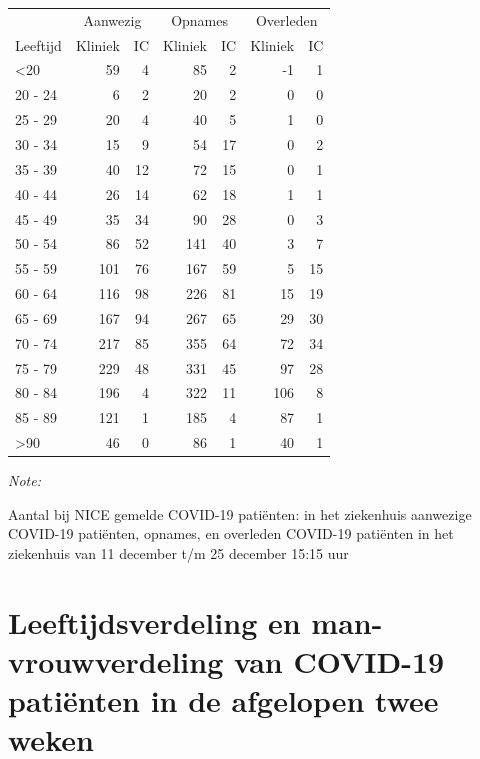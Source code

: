 \documentclass[
  english,
  man,floatsintext]{apa6}
\begin{document}
\begin{table}
\centering\begingroup\fontsize{10}{12}\selectfont

\begin{threeparttable}
\begin{tabular}{lrrrrrr}
\toprule
\multicolumn{1}{c}{ } & \multicolumn{2}{c}{Aanwezig} & \multicolumn{2}{c}{Opnames} & \multicolumn{2}{c}{Overleden} \\
\cmidrule(l{3pt}r{3pt}){2-3} \cmidrule(l{3pt}r{3pt}){4-5} \cmidrule(l{3pt}r{3pt}){6-7}
Leeftijd & Kliniek & IC & Kliniek & IC & Kliniek & IC\\
\midrule
<20 & 59 & 4 & 85 & 2 & -1 & 1\\
20 - 24 & 6 & 2 & 20 & 2 & 0 & 0\\
25 - 29 & 20 & 4 & 40 & 5 & 1 & 0\\
30 - 34 & 15 & 9 & 54 & 17 & 0 & 2\\
35 - 39 & 40 & 12 & 72 & 15 & 0 & 1\\
40 - 44 & 26 & 14 & 62 & 18 & 1 & 1\\
45 - 49 & 35 & 34 & 90 & 28 & 0 & 3\\
50 - 54 & 86 & 52 & 141 & 40 & 3 & 7\\
55 - 59 & 101 & 76 & 167 & 59 & 5 & 15\\
60 - 64 & 116 & 98 & 226 & 81 & 15 & 19\\
65 - 69 & 167 & 94 & 267 & 65 & 29 & 30\\
70 - 74 & 217 & 85 & 355 & 64 & 72 & 34\\
75 - 79 & 229 & 48 & 331 & 45 & 97 & 28\\
80 - 84 & 196 & 4 & 322 & 11 & 106 & 8\\
85 - 89 & 121 & 1 & 185 & 4 & 87 & 1\\
>90 & 46 & 0 & 86 & 1 & 40 & 1\\
\bottomrule
\end{tabular}
\begin{tablenotes}
\item \textit{Note: } 
\item Aantal bij NICE gemelde COVID-19 patiënten: in het ziekenhuis aanwezige COVID-19 patiënten, opnames, en overleden COVID-19 patiënten in het ziekenhuis van 11 december t/m 25 december 15:15 uur
\end{tablenotes}
\end{threeparttable}
\endgroup{}
\end{table}

\newpage

\hypertarget{leeftijdsverdeling-en-man-vrouwverdeling-van-covid-19-patiuxebnten-in-de-afgelopen-twee-weken}{%
\section{Leeftijdsverdeling en man-vrouwverdeling van COVID-19 patiënten in de afgelopen twee weken}\label{leeftijdsverdeling-en-man-vrouwverdeling-van-covid-19-patiuxebnten-in-de-afgelopen-twee-weken}}
\end{document}
